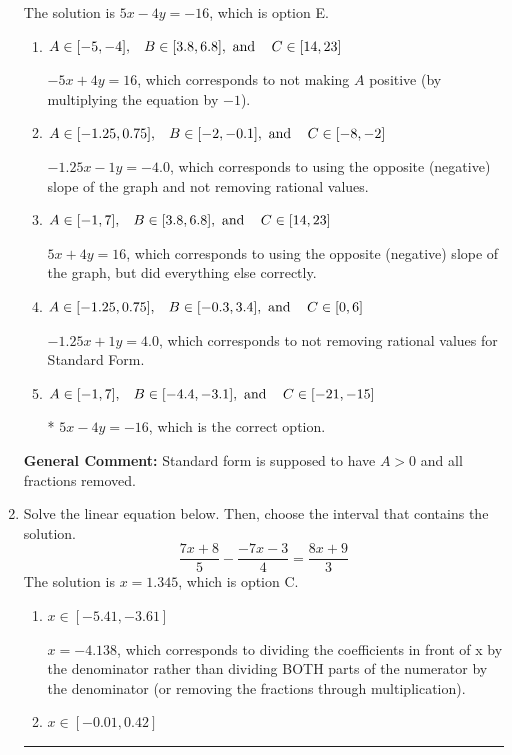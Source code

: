 \documentclass{extbook}[14pt]
\newcommand{\litem}[1]{\item #1

\rule{\textwidth}{0.4pt}}
\begin{document}
\begin{enumerate}
{The solution is \( 5x - 4y = -16 \), which is option E.\begin{enumerate}[label=\Alph*.]
\item \( A \in [-5, -4], \hspace{3mm} B \in [3.8, 6.8], \text{ and } \hspace{3mm} C \in [14, 23] \)

 $-5x + 4y = 16$, which corresponds to not making $A$ positive (by multiplying the equation by $-1$).
\item \( A \in [-1.25, 0.75], \hspace{3mm} B \in [-2, -0.1], \text{ and } \hspace{3mm} C \in [-8, -2] \)

 $-1.25x - 1y = -4.0$, which corresponds to using the opposite (negative) slope of the graph and not removing rational values.
\item \( A \in [-1, 7], \hspace{3mm} B \in [3.8, 6.8], \text{ and } \hspace{3mm} C \in [14, 23] \)

 $5x + 4y = 16$, which corresponds to using the opposite (negative) slope of the graph, but did everything else correctly.
\item \( A \in [-1.25, 0.75], \hspace{3mm} B \in [-0.3, 3.4], \text{ and } \hspace{3mm} C \in [0, 6] \)

 $-1.25x + 1y = 4.0$, which corresponds to not removing rational values for Standard Form.
\item \( A \in [-1, 7], \hspace{3mm} B \in [-4.4, -3.1], \text{ and } \hspace{3mm} C \in [-21, -15] \)

* $5x - 4y = -16$, which is the correct option.
\end{enumerate}

\textbf{General Comment:} Standard form is supposed to have $A > 0$ and all fractions removed.
}
\litem{
Solve the linear equation below. Then, choose the interval that contains the solution.
\[ \frac{7x + 8}{5} - \frac{-7x -3}{4} = \frac{8x + 9}{3} \]
The solution is \( x = 1.345 \), which is option C.\begin{enumerate}[label=\Alph*.]
\item \( x \in [-5.41, -3.61] \)

 $x = -4.138$, which corresponds to dividing the coefficients in front of x by the denominator rather than dividing BOTH parts of the numerator by the denominator (or removing the fractions through multiplication).
\item \( x \in [-0.01, 0.42] \)


\end{enumerate}}
\end{enumerate}
\end{document}
